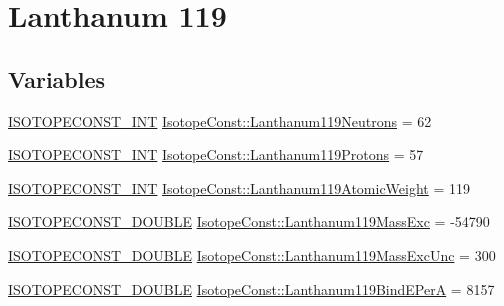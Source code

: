 \hypertarget{group___isotope_const-_lanthanum-_la119}{}\section{Lanthanum 119}
\label{group___isotope_const-_lanthanum-_la119}
\subsection*{Variables}
\begin{DoxyCompactItemize}
\item 
\mbox{\hyperlink{group___isotope_const-_macros_ga5f18360b3e99483a35c32d789e62621c}{I\+S\+O\+T\+O\+P\+E\+C\+O\+N\+S\+T\+\_\+\+I\+NT}} \mbox{\hyperlink{group___isotope_const-_lanthanum-_la119_ga20ba3762f4ce8d78456752b732ae9caf}{Isotope\+Const\+::\+Lanthanum119\+Neutrons}} = 62
\item 
\mbox{\hyperlink{group___isotope_const-_macros_ga5f18360b3e99483a35c32d789e62621c}{I\+S\+O\+T\+O\+P\+E\+C\+O\+N\+S\+T\+\_\+\+I\+NT}} \mbox{\hyperlink{group___isotope_const-_lanthanum-_la119_gaa363337328ad2b87844b814d68e13a97}{Isotope\+Const\+::\+Lanthanum119\+Protons}} = 57
\item 
\mbox{\hyperlink{group___isotope_const-_macros_ga5f18360b3e99483a35c32d789e62621c}{I\+S\+O\+T\+O\+P\+E\+C\+O\+N\+S\+T\+\_\+\+I\+NT}} \mbox{\hyperlink{group___isotope_const-_lanthanum-_la119_gac6b2db5943cb24b2964bf602e29355e6}{Isotope\+Const\+::\+Lanthanum119\+Atomic\+Weight}} = 119
\item 
\mbox{\hyperlink{group___isotope_const-_macros_ga8f45a7272ce02c0b4c65c44636ed719a}{I\+S\+O\+T\+O\+P\+E\+C\+O\+N\+S\+T\+\_\+\+D\+O\+U\+B\+LE}} \mbox{\hyperlink{group___isotope_const-_lanthanum-_la119_gaa6a0079171891d69bf4199f2511800c2}{Isotope\+Const\+::\+Lanthanum119\+Mass\+Exc}} = -\/54790
\item 
\mbox{\hyperlink{group___isotope_const-_macros_ga8f45a7272ce02c0b4c65c44636ed719a}{I\+S\+O\+T\+O\+P\+E\+C\+O\+N\+S\+T\+\_\+\+D\+O\+U\+B\+LE}} \mbox{\hyperlink{group___isotope_const-_lanthanum-_la119_ga9f29b6773dd712f135f195cf72c91f19}{Isotope\+Const\+::\+Lanthanum119\+Mass\+Exc\+Unc}} = 300
\item 
\mbox{\hyperlink{group___isotope_const-_macros_ga8f45a7272ce02c0b4c65c44636ed719a}{I\+S\+O\+T\+O\+P\+E\+C\+O\+N\+S\+T\+\_\+\+D\+O\+U\+B\+LE}} \mbox{\hyperlink{group___isotope_const-_lanthanum-_la119_gaa01df4c7d0a6bbce7096ee317a3a2aef}{Isotope\+Const\+::\+Lanthanum119\+Bind\+E\+PerA}} = 8157
\item 

\end{DoxyCompactItemize}
